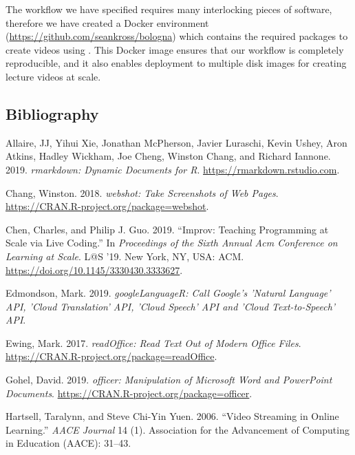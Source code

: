 The workflow we have specified requires many interlocking pieces of
software, therefore we have created a Docker environment
(\url{https://github.com/seankross/bologna}) which contains the required
packages to create videos using . This Docker image ensures
that our workflow is completely reproducible, and it also enables
deployment to multiple disk images for creating lecture videos at scale.

\hypertarget{bibliography}{%
\subsection{Bibliography}\label{bibliography}}



\hypertarget{refs}{}
\leavevmode\hypertarget{ref-rmarkdown}{}%
Allaire, JJ, Yihui Xie, Jonathan McPherson, Javier Luraschi, Kevin
Ushey, Aron Atkins, Hadley Wickham, Joe Cheng, Winston Chang, and
Richard Iannone. 2019. \emph{rmarkdown: Dynamic Documents for R}.
\url{https://rmarkdown.rstudio.com}.

\leavevmode\hypertarget{ref-webshot}{}%
Chang, Winston. 2018. \emph{webshot: Take Screenshots of Web Pages}.
\url{https://CRAN.R-project.org/package=webshot}.

\leavevmode\hypertarget{ref-ChenLAS2019}{}%
Chen, Charles, and Philip J. Guo. 2019. ``Improv: Teaching Programming
at Scale via Live Coding.'' In \emph{Proceedings of the Sixth Annual Acm
Conference on Learning at Scale}. L@S '19. New York, NY, USA: ACM.
\url{https://doi.org/10.1145/3330430.3333627}.

\leavevmode\hypertarget{ref-googleLanguageR}{}%
Edmondson, Mark. 2019. \emph{googleLanguageR: Call Google's 'Natural
Language' API, 'Cloud Translation' API, 'Cloud Speech' API and 'Cloud
Text-to-Speech' API}.

\leavevmode\hypertarget{ref-readOffice}{}%
Ewing, Mark. 2017. \emph{readOffice: Read Text Out of Modern Office
Files}. \url{https://CRAN.R-project.org/package=readOffice}.

\leavevmode\hypertarget{ref-officer}{}%
Gohel, David. 2019. \emph{officer: Manipulation of Microsoft Word and
PowerPoint Documents}. \url{https://CRAN.R-project.org/package=officer}.

\leavevmode\hypertarget{ref-hartsell2006video}{}%
Hartsell, Taralynn, and Steve Chi-Yin Yuen. 2006. ``Video Streaming in
Online Learning.'' \emph{AACE Journal} 14 (1). Association for the
Advancement of Computing in Education (AACE): 31--43.

